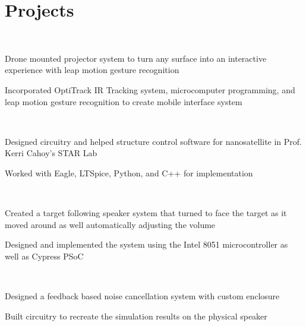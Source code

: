 \documentclass[letterpaper, article]{deedy-resume-openfont}
\begin{document}
\begin{minipage}[t]{0.66\textwidth}

\section{Projects}
\\
\begin{tightemize}
	\item Drone mounted projector system to turn any surface into an interactive experience with leap motion gesture recognition
	\item Incorporated OptiTrack IR Tracking system, microcomputer programming, and leap motion gesture recognition to create mobile interface system
\end{tightemize}

\\
\begin{tightemize}
	\item Designed circuitry and helped structure control software for nanosatellite in Prof. Kerri Cahoy's STAR Lab
	\item Worked with Eagle, LTSpice, Python, and C++ for implementation
\end{tightemize}

\\
\begin{tightemize}
	\item Created a target following speaker system that turned to face the target as it moved around as well automatically adjusting the volume
	\item Designed and implemented the system using the Intel 8051 microcontroller as well as Cypress PSoC
\end{tightemize}

\\
\begin{tightemize}
	\item Designed a feedback based noise cancellation system with custom enclosure
	\item Built circuitry to recreate the simulation results on the physical speaker
\end{tightemize}


\end{minipage}
\end{document}
